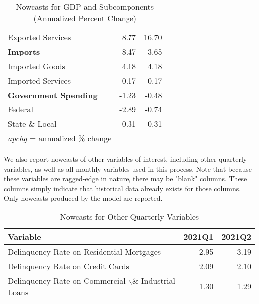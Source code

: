 \documentclass[11pt, letterpaper]{article}\usepackage[]{graphicx}\usepackage[]{color}
\begin{document}
\begin{table}[H]
\begin{tabular}{lrr}
  \hspace{8mm}  Exported Services & 8.77 & 16.70 \\ 
  \hspace{0mm} \textbf{Imports} & 8.47 & 3.65 \\ 
  \hspace{8mm}  Imported Goods & 4.18 & 4.18 \\ 
  \hspace{8mm}  Imported Services & -0.17 & -0.17 \\ 
  \hspace{0mm} \textbf{Government Spending} & -1.23 & -0.48 \\ 
  \hspace{8mm}  Federal & -2.89 & -0.74 \\ 
  \hspace{8mm}  State \& Local & -0.31 & -0.31 \\ 
   \hline 
 \textit{apchg} = annualized \% change 
\end{tabular}
\endgroup
\caption{Nowcasts for GDP and Subcomponents (Annualized Percent Change)} 
\end{table}


We also report nowcasts of other variables of interest, including other quarterly variables, as well as all monthly variables used in this process. Note that because these variables are ragged-edge in nature, there may be "blank" columns. These columns simply indicate that historical data already exists for those columns. Only nowcasts produced by the model are reported.
\begin{table}[H]
\centering
\begingroup\fontsize{11pt}{13pt}\selectfont
\begin{tabular}{lrr}
  \hline
Variable & 2021Q1 & 2021Q2 \\ 
  \hline
Delinquency Rate on Residential Mortgages & 2.95 & 3.19 \\ 
  Delinquency Rate on Credit Cards & 2.09 & 2.10 \\ 
  Delinquency Rate on Commercial $\backslash$\& Industrial Loans & 1.30 & 1.29 \\ 
   \hline
\end{tabular}
\endgroup
\caption{Nowcasts for Other Quarterly Variables} 
\end{table}
\end{document}
